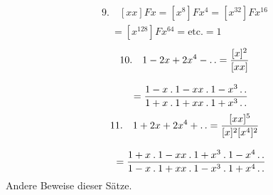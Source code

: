 \[
\begin{gathered}9.\quad [xx]Fx=[x^8]Fx^4=[x^{32}]Fx^{16}\\[8pt]\quad{}=[x^{128}]Fx^{64}=\mathrm{etc.}=1\end{gathered}
\]
\[
\begin{gathered}10.\quad1-2x+2x^4-\mathinner{.\,.}
=\frac{[x]^2}{[xx]}
\\[8pt]\quad{}=\frac{1-x\mathbin{.}1-xx\mathbin{.}1-x^3\mathinner{.\,.}}
{1+x\mathbin{.}1+xx\mathbin{.}1+x^3\mathinner{.\,.}}\end{gathered}
\]
\[
\begin{gathered}11.\quad1+2x+2x^4+\mathinner{.\,.}
=\frac{[xx]^5}{[x]^2[x^4]^2}
\\[8pt]\quad{}=\frac{1+x\mathbin{.}1-xx\mathbin{.}1+x^3\mathbin{.}1-x^4\mathinner{.\,.}}
{1-x\mathbin{.}1+xx\mathbin{.}1-x^3\mathbin{.}1+x^4\mathinner{.\,.}}\end{gathered}
\]
Andere Beweise dieser Sätze.


